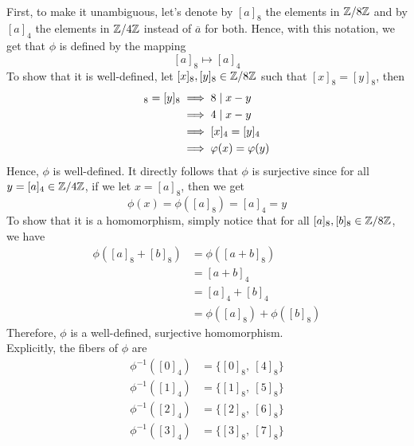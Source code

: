 \begin{solution}
    \\ First, to make it unambiguous, let's denote by $[a]_8$ the elements in $\mathbb{Z} / 8 \mathbb{Z}$ and by $[a]_4$ the elements in $\mathbb{Z} / 4 \mathbb{Z}$ instead of $\overline{a}$ for both. Hence, with this notation, we get that $\phi$ is defined by the mapping 
    $$[a]_8 \mapsto [a]_4$$
    To show that it is well-defined, let $[x]_8,[y]_8 \in \mathbb{Z} / 8 \mathbb{Z}$ such that $[x]_8 = [y]_8$, then 
    \begin{align*}
        [x]_8 = [y]_8 &\implies 8 \dvd x - y \\
        &\implies 4 \dvd x-y \\
        &\implies [x]_4 = [y]_4 \\
        &\implies \phi(x) = \phi(y)
    \end{align*}
    Hence, $\phi$ is well-defined. It directly follows that $\phi$ is surjective since for all $y = [a]_4 \in \mathbb{Z} / 4 \mathbb{Z}$, if we let $x = [a]_8$, then we get
    $$\phi(x) = \phi([a]_8) = [a]_4 = y$$
    To show that it is a homomorphism, simply notice that for all $[a]_8, [b]_8 \in \mathbb{Z} / 8 \mathbb{Z}$, we have 
    \begin{align*}
        \phi([a]_8 + [b]_8) &= \phi([a + b]_8)\\
        &= [a + b]_4 \\
        &= [a]_4 + [b]_4 \\
        &= \phi([a]_8) + \phi([b]_8)
    \end{align*}
    Therefore, $\phi$ is a well-defined, surjective homomorphism. \\
    Explicitly, the fibers of $\phi$ are 
    \begin{align*}
        \phi^{-1}([0]_4) &= \{[0]_8, \ [4]_8\} \\
        \phi^{-1}([1]_4) &= \{[1]_8, \ [5]_8\} \\
        \phi^{-1}([2]_4) &= \{[2]_8, \ [6]_8\} \\
        \phi^{-1}([3]_4) &= \{[3]_8, \ [7]_8\} \\
    \end{align*}
\end{solution}

